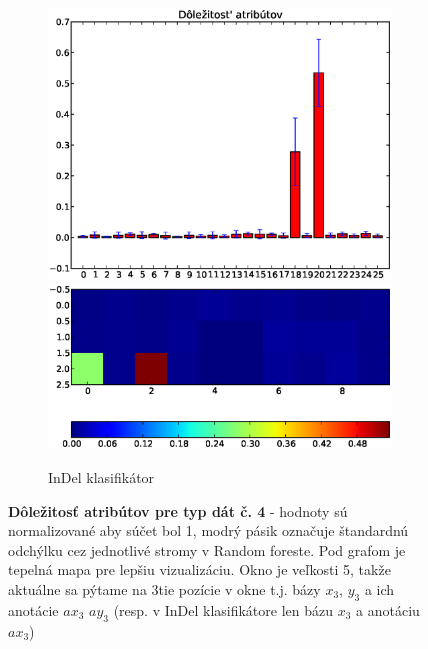 \begin{figure}[htp]
\begin{subfigure}[t]{0.4\textwidth}
                \includegraphics[width=\textwidth]{images/clf_fi/randomforest_combined_5_indel_bars}
                \includegraphics[width=\textwidth]{images/clf_fi/randomforest_combined_5_indel_heatmap}
                \caption{InDel klasifikátor}
                \label{fig:datatype2-i}
        \end{subfigure}
        \caption[Dôležitosť atribútov pre typ dát č. 4]{
        \textbf{Dôležitosť atribútov pre typ dát č. 4} - hodnoty sú normalizované aby súčet bol 1, modrý pásik označuje štandardnú odchýlku cez jednotlivé stromy v Random foreste.
        Pod grafom je tepelná mapa pre lepšiu vizualizáciu. Okno je veľkosti 5, takže aktuálne sa pýtame na 3tie pozície v okne t.j. bázy $x_3$, $y_3$ a ich anotácie $ax_3$ $ay_3$ (resp. v InDel klasifikátore len bázu $x_3$ a anotáciu $ax_3$)
        }
        \label{fig:datatype4}

\end{figure}

